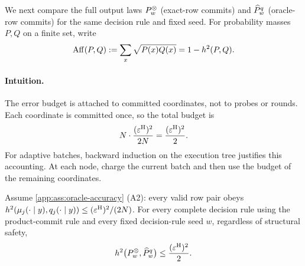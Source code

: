 We next compare the full output laws $\ExactCommitOutputLaw{w}$ (exact-row
commits) and $\SamplerOutputLaw{w}{\FrozenOracle}$ (oracle-row commits) for
the same decision rule and fixed seed.  For probability masses $P,Q$ on a
finite set, write
\begin{equation}
 \HellingerAffinity(P,Q)
 :=\sum_x\sqrt{P(x)Q(x)}
 =1-\sqHellinger(P,Q).
 \label{app:eq:affinity-definition}
\end{equation}

\paragraph{Intuition.}
The error budget is attached to committed coordinates, not to probes or
rounds.  Each coordinate is committed once, so the total budget is
\[
 N\cdot\frac{(\OracleRadius)^2}{2N}=\frac{(\OracleRadius)^2}{2}.
\]
For adaptive batches, backward induction on the execution tree justifies
this accounting.  At each node, charge the current batch and then use the
budget of the remaining coordinates.

\begin{lemma}
\label{app:lem:adaptive-hellinger-upper}
{\color{red}Assume \cref{app:ass:oracle-accuracy} (A2): every valid row pair obeys
$\sqHellinger(\ExactRow{y}{j},\OracleRow{y}{j})
 \le(\OracleRadius)^2/(2N)$.  For every complete decision rule using the
product-commit rule and every fixed decision-rule seed $w$, regardless of
structural safety,}
\begin{equation}
 \sqHellinger\bigl(
  \ExactCommitOutputLaw{w},
  \SamplerOutputLaw{w}{\FrozenOracle}
 \bigr)
 \le\frac{(\OracleRadius)^2}{2}.
 \label{app:eq:global-upper-hellinger}
\end{equation}
\end{lemma}

